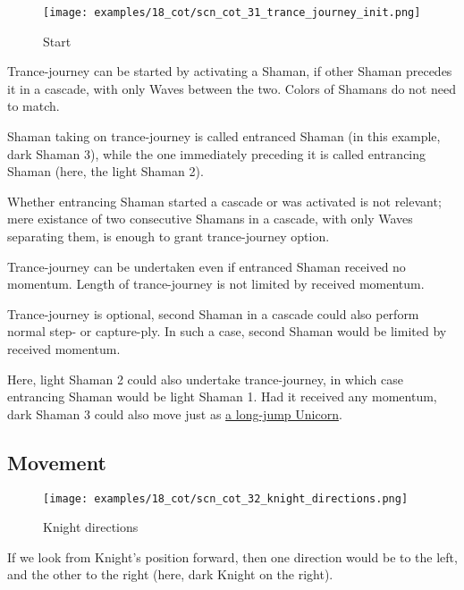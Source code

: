 \noindent
\begin{wrapfigure}[13]{l}{0.4\textwidth}
\centering
\texttt{[image: examples/18\_cot/scn\_cot\_31\_trance\_journey\_init.png]}
\caption{Start}
\label{fig:scn_cot_31_trance_journey_init}
\end{wrapfigure}
Trance-journey can be started by activating a Shaman, if other Shaman precedes
it in a cascade, with only Waves between the two. Colors of Shamans do not need
to match.

Shaman taking on trance-journey is called entranced Shaman (in this example,
dark Shaman 3), while the one immediately preceding it is called entrancing
Shaman (here, the light Shaman 2).

Whether entrancing Shaman started a cascade or was activated is not relevant;
mere existance of two consecutive Shamans in a cascade, with only Waves separating
them, is enough to grant trance-journey option.

Trance-journey can be undertaken even if entranced Shaman received no momentum.
Length of trance-journey is not limited by received momentum.

Trance-journey is optional, second Shaman in a cascade could also perform normal
step- or capture-ply. In such a case, second Shaman would be limited by received
momentum.

Here, light Shaman 2 could also undertake trance-journey, in which case entrancing
Shaman would be light Shaman 1.
Had it received any momentum, dark Shaman 3 could also move just as
\hyperref[fig:scn_cot_04_dark_shaman_step_ply]{a long-jump Unicorn}.

\clearpage %

\subsection*{Movement}
\label{sec:Conquest of Tlalocan/Trance-journey/Movement}

\noindent
\begin{wrapfigure}[10]{l}{0.4\textwidth}
\centering
\texttt{[image: examples/18\_cot/scn\_cot\_32\_knight\_directions.png]}
\caption{Knight directions}
\label{fig:scn_cot_32_knight_directions}
\end{wrapfigure}
If we look from Knight's position forward, then one direction would be to
the left, and the other to the right (here, dark Knight on the right).

